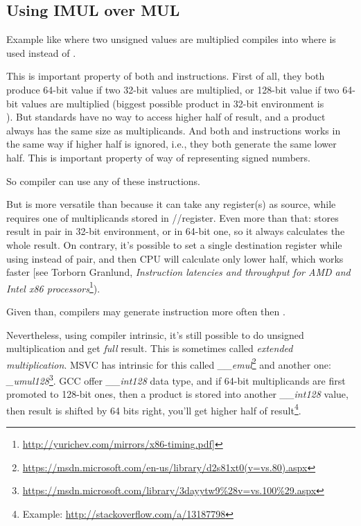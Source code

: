 \subsection{Using IMUL over MUL}
\label{IMUL_over_MUL}

Example like  where two unsigned values are multiplied compiles into  where \IMUL is used instead of \MUL.

This is important property of both \MUL and \IMUL instructions.
First of all, they both produce 64-bit value if two 32-bit values are multiplied, or 128-bit value if two 64-bit values are multiplied (biggest possible \gls{product} in 32-bit environment is \\
).
But \CCpp standards have no way to access higher half of result, and a \gls{product} always has the same size as multiplicands. %
And both \MUL and \IMUL instructions works in the same way if higher half is ignored, i.e., they both generate
the same lower half.
This is important property of  way of representing signed numbers.

So \CCpp compiler can use any of these instructions.

But \IMUL is more versatile than \MUL because it can take any register(s) as source, while \MUL requires one of multiplicands stored in \AX/\EAX/\RAX register.
Even more than that: \MUL stores result in  pair in 32-bit environment, or  in 64-bit one, so it always calculates the whole result.
On contrary, it's possible to set a single destination register while using \IMUL instead of pair, and then \ac{CPU} will calculate only lower half, which works faster [see Torborn Granlund, \emph{Instruction latencies and throughput for AMD and Intel x86 processors}\footnote{\url{http://yurichev.com/mirrors/x86-timing.pdf}]}).

Given than, \CCpp compilers may generate \IMUL instruction more often then \MUL.

Nevertheless, using compiler intrinsic, it's still possible to do unsigned multiplication and get \emph{full} result.
This is sometimes called \emph{extended multiplication}.
MSVC has intrinsic for this called \emph{\_\_emul}\footnote{\url{https://msdn.microsoft.com/en-us/library/d2s81xt0(v=vs.80).aspx}} and another one: \emph{\_umul128}\footnote{\url{https://msdn.microsoft.com/library/3dayytw9%28v=vs.100%29.aspx}}.
GCC offer \emph{\_\_int128} data type, and if 64-bit multiplicands are first promoted to 128-bit ones,
then a \gls{product} is stored into another \emph{\_\_int128} value, then result is shifted by 64 bits right,
you'll get higher half of result\footnote{Example: \url{http://stackoverflow.com/a/13187798}}.

